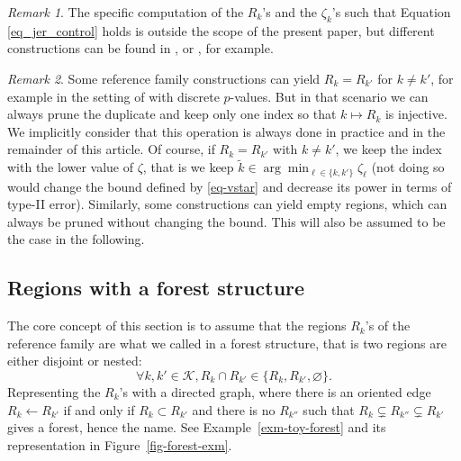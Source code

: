 \documentclass[
  11pt,
  a4paper,
]{article}
\theoremstyle{definition}
\theoremstyle{plain}
\theoremstyle{plain}
\theoremstyle{plain}
\theoremstyle{definition}
\theoremstyle{remark}
\newtheorem{refremark}{Remark}[section]
\begin{document}
\begin{refremark}
The specific computation of the \(R_k\)'s and the \(\zeta_k\)'s such
that Equation \eqref{eq_jer_control} holds is outside the scope of the
present paper, but different constructions can be found in
\citet{MR4124323}, \citet{MR4178188} or \citet{blain22notip}, for
example.

\label{rem-zeta}

\end{refremark}

\begin{refremark}
Some reference family constructions can yield \(R_k=R_{k'}\) for
\(k\neq k'\), for example in the setting of \citet{JMLR:v25:23-1025}
with discrete \(p\)-values. But in that scenario we can always prune the
duplicate and keep only one index so that \(k\mapsto R_k\) is injective.
We implicitly consider that this operation is always done in practice
and in the remainder of this article. Of course, if \(R_k=R_{k'}\) with
\(k\neq k'\), we keep the index with the lower value of \(\zeta\), that
is we keep \(\tilde k\in\arg\min_{\ell\in\{k,k'\}}\zeta_{\ell}\) (not
doing so would change the bound defined by \eqref{eq-vstar} and decrease
its power in terms of type-II error). Similarly, some constructions can
yield empty regions, which can always be pruned without changing the
bound. This will also be assumed to be the case in the following.

\label{rem-distinct}

\end{refremark}

\subsection{Regions with a forest structure}\label{sec-forest-structure}

The core concept of this section is to assume that the regions \(R_k\)'s
of the reference family are what we called in \citet{MR4178188} a forest
structure, that is two regions are either disjoint or nested:
\begin{equation}
\forall k,k'\in\mathcal{K} , R_k \cap R_{k'} \in \{ R_k,  R_{k'} , \varnothing \}.
\label{eq-forest}
\end{equation} Representing the \(R_k\)'s with a directed graph, where
there is an oriented edge \(R_k \leftarrow R_{k'}\) if and only if
\(R_k \subset R_{k'}\) and there is no \(R_{k''}\) such that
\(R_k \subsetneq R_{k''}\subsetneq R_{k'}\) gives a forest, hence the
name. See Example~\ref{exm-toy-forest} and its representation in
Figure~\ref{fig-forest-exm}.
\end{document}
